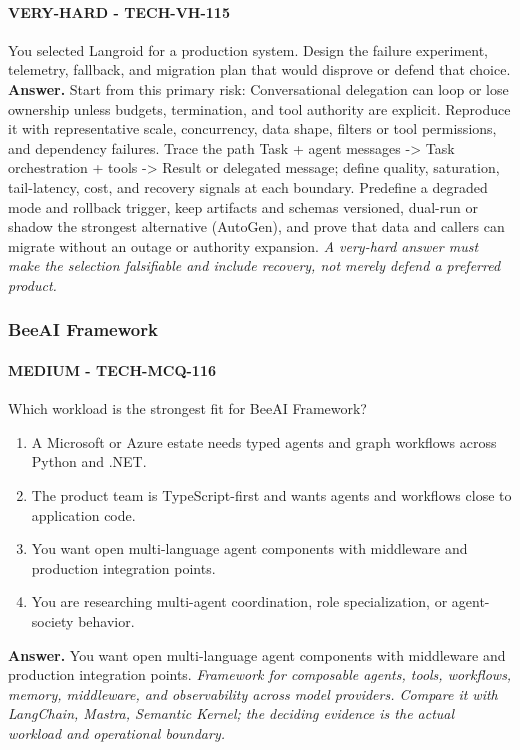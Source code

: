 \paragraph{VERY-HARD - TECH-VH-115} You selected Langroid for a production system. Design the failure experiment, telemetry, fallback, and migration plan that would disprove or defend that choice.
\textbf{Answer.} Start from this primary risk: Conversational delegation can loop or lose ownership unless budgets, termination, and tool authority are explicit. Reproduce it with representative scale, concurrency, data shape, filters or tool permissions, and dependency failures. Trace the path Task + agent messages -> Task orchestration + tools -> Result or delegated message; define quality, saturation, tail-latency, cost, and recovery signals at each boundary. Predefine a degraded mode and rollback trigger, keep artifacts and schemas versioned, dual-run or shadow the strongest alternative (AutoGen), and prove that data and callers can migrate without an outage or authority expansion.
\textit{A very-hard answer must make the selection falsifiable and include recovery, not merely defend a preferred product.}
\subsubsection*{BeeAI Framework}
\paragraph{MEDIUM - TECH-MCQ-116} Which workload is the strongest fit for BeeAI Framework?
\begin{enumerate}[label=\Alph*.]
\item A Microsoft or Azure estate needs typed agents and graph workflows across Python and .NET.
\item The product team is TypeScript-first and wants agents and workflows close to application code.
\item You want open multi-language agent components with middleware and production integration points.
\item You are researching multi-agent coordination, role specialization, or agent-society behavior.
\end{enumerate}
\textbf{Answer.} You want open multi-language agent components with middleware and production integration points.
\textit{Framework for composable agents, tools, workflows, memory, middleware, and observability across model providers. Compare it with LangChain, Mastra, Semantic Kernel; the deciding evidence is the actual workload and operational boundary.}
